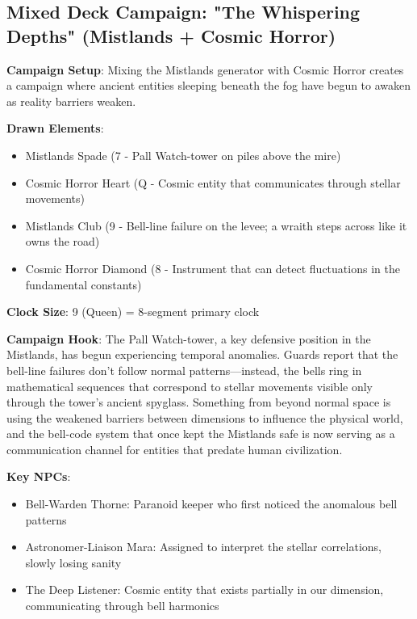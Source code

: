 \documentclass[11pt]{article}
\begin{document}
\subsection*{Mixed Deck Campaign: "The Whispering Depths" (Mistlands + Cosmic Horror)}

\begin{mdframed}[backgroundcolor=horrorbg]
\textbf{Campaign Setup}:
Mixing the Mistlands generator with Cosmic Horror creates a campaign where ancient entities sleeping beneath the fog have begun to awaken as reality barriers weaken.

\textbf{Drawn Elements}:
\begin{itemize}[leftmargin=*]
\item Mistlands Spade (7 - Pall Watch-tower on piles above the mire)
\item Cosmic Horror Heart (Q - Cosmic entity that communicates through stellar movements)
\item Mistlands Club (9 - Bell-line failure on the levee; a wraith steps across like it owns the road)
\item Cosmic Horror Diamond (8 - Instrument that can detect fluctuations in the fundamental constants)
\end{itemize}

\textbf{Clock Size}: 9 (Queen) = 8-segment primary clock

\textbf{Campaign Hook}:
The Pall Watch-tower, a key defensive position in the Mistlands, has begun experiencing temporal anomalies. Guards report that the bell-line failures don't follow normal patterns—instead, the bells ring in mathematical sequences that correspond to stellar movements visible only through the tower's ancient spyglass. Something from beyond normal space is using the weakened barriers between dimensions to influence the physical world, and the bell-code system that once kept the Mistlands safe is now serving as a communication channel for entities that predate human civilization.

\textbf{Key NPCs}:
\begin{itemize}[leftmargin=*]
\item Bell-Warden Thorne: Paranoid keeper who first noticed the anomalous bell patterns
\item Astronomer-Liaison Mara: Assigned to interpret the stellar correlations, slowly losing sanity
\item The Deep Listener: Cosmic entity that exists partially in our dimension, communicating through bell harmonics
\end{itemize}


\end{mdframed}
\end{document}
